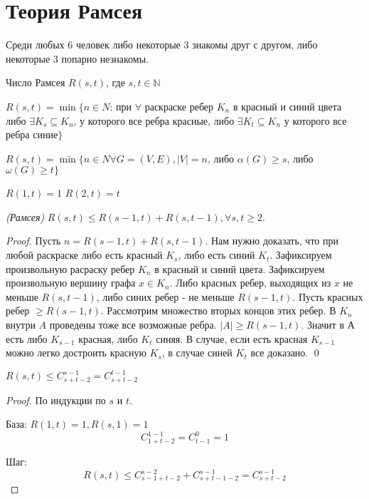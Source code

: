 \section{Теория Рамсея}

\begin{proposition}
    Среди любых 6 человек либо некоторые 3 знакомы друг с другом, либо некоторые 3 попарно незнакомы.
\end{proposition}

\begin{definition} Число Рамсея $R(s, t)$, где $s, t \in \mathbb{N}$

    $ R(s,t)=\min\{n \in N $: при $ \forall $ раскраске ребер $K_n$ в красный и синий цвета либо $\exists K_s \subseteq K_n $,
    у  которого все ребра красные, либо $\exists K_t \subseteq K_n $ у которого все ребра синие$ \} $

    $R(s,t) = \min\{n \in N \forall G=(V,E), |V|=n$, либо $\alpha(G) \ge s$, либо $\omega(G) \ge t\}$

    $R(1,t) = 1$
    $R(2,t) = t$
\end{definition}


\begin{theorem}
    \emph{ (Рамсея) }
    $R(s,t) \le R(s-1,t) + R(s,t-1), \forall s,t \ge 2$.
    \begin{proof}
        Пусть $n = R(s - 1,t) + R(s,t - 1)$. Нам нужно доказать, что при любой раскраске либо есть красный $K_s$, 
        либо есть синий $K_t$.
        Зафиксируем произвольную расраску ребер $K_n$ в красный и синий цвета.
        Зафиксируем произвольную вершину графа $x \in K_n$.
        Либо красных ребер, выходящих из $x$ не меньше $ R(s,t-1)$, либо синих ребер - не меньше $R(s-1,t)$.
        Пусть красных ребер $\ge R(s-1,t)$. Рассмотрим множество вторых концов этих ребер.
        В $K_n$ внутри $A$ проведены тоже все возможные ребра. $|A| \ge R(s-1,t)$.
        Значит в А есть либо $K_{s-1}$ красная, либо $K_t$ синяя.
        В случае, если есть красная $K_{s-1}$ можно легко достроить красную $K_s$, в случае синей $K_t$ все доказано.
        \qed
    \end{proof}
\end{theorem}

\begin{corollary}
    $R(s,t) \le C_{s+t-2}^{s-1}=C_{s+t-2}^{t-1}$
    \begin{proof}
        По индукции по $s$ и $t$.

        База:
        $R(1,t)=1, R(s,1) = 1$
        $$C_{1+t-2}^{1-1}=C_{t-1}^0=1$$

        Шаг:
        $$R(s,t) \le C_{s-1+t-2}^{s-2} + C_{s+t-1-2}^{s-1}=C_{s+t-2}^{s-1}$$
    \end{proof}
\end{corollary}

